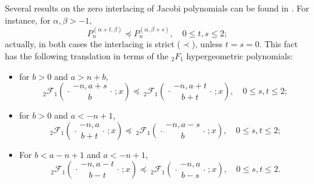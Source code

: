 \documentclass[reqno,11pt]{amsart}
\theoremstyle{remark}
\newcommand*\pFq[5]{%
 {\ }_{#1}{\mathcal F}_{#2}{\left(\genfrac..{0pt}{}{#3}{#4};#5\right)}%
}
\begin{document}
Several results on the zero interlacing of Jacobi polynomials can be found in \cite{driver2008interlacing}. For instance, for $\alpha,\beta>-1$,
$$
P_{n}^{(\alpha+t,\beta)} \preccurlyeq P_{n}^{(\alpha,\beta+s)}, \quad 0\leq t,s\leq 2;
$$
actually, in both cases the interlacing is strict ($\prec$), unless $t=s=0$. This fact has the following translation in terms of the ${}_2 F_1$ hypergeometric polynomials:  
\begin{itemize}
    \item for $b>0$ and $a> n+b $,
    \begin{equation}
        \label{interlacing2F1_1}
        \pFq{2}{1}{-n,a+s}{b}{x}\preccurlyeq \pFq{2}{1}{-n,a+t}{b+t}{x}, \quad 0\le s, t \le 2;
    \end{equation}
    
    \item for $b>0 $ and $a<-n+1$,
    \begin{equation}
        \label{interlacing2F1_2}
        \pFq{2}{1}{-n,a}{b+t}{x}\preccurlyeq \pFq{2}{1}{-n,a-s}{b}{x}, \quad 0\le s, t \le 2;
    \end{equation}

    \item For $b<a-n+1$ and $a<-n+1$,
    \begin{equation}
        \label{interlacing2F1_3}
        \pFq{2}{1}{-n,a-t}{b-t}{x}\preccurlyeq \pFq{2}{1}{-n,a}{b-s}{x}, \quad 0\le s, t \le 2.
    \end{equation}
\end{itemize}
\end{document}

